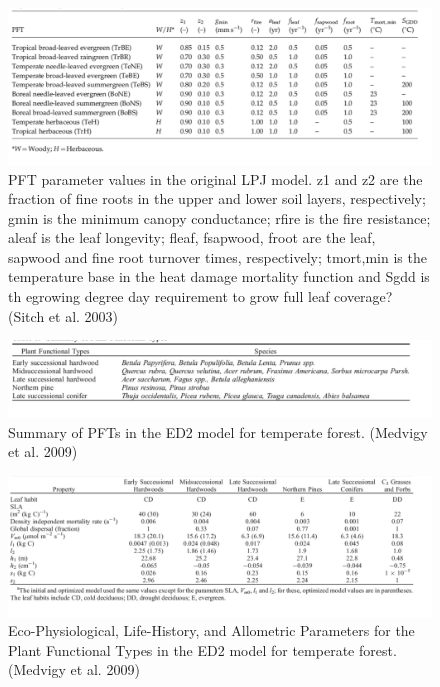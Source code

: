 \documentclass[12pt,oneside]{book}
\begin{document}
\begin{figure}

{\centering \includegraphics[width=0.8\linewidth]{figures/chap7/f714_LPJ_pft_table} 

}

\caption{PFT parameter values in the original LPJ model. z1 and z2 are the fraction of fine roots in the upper and lower soil layers, respectively; gmin is the minimum canopy conductance; rfire is the fire resistance; aleaf is the leaf longevity; fleaf, fsapwood, froot are the leaf, sapwood and fine root turnover times, respectively; tmort,min is the temperature base in the heat damage mortality function and Sgdd is th egrowing degree day requirement to grow full leaf coverage? (Sitch et al. 2003)}\label{fig:f714}
\end{figure}

\begin{figure}

{\centering \includegraphics[width=0.8\linewidth]{figures/chap7/f715_ed2_pft_table} 

}

\caption{Summary of PFTs in the ED2 model for temperate forest. (Medvigy  et al. 2009)}\label{fig:f715}
\end{figure}

\begin{figure}

{\centering \includegraphics[width=0.8\linewidth]{figures/chap7/f716_ED2_pft_values_table} 

}

\caption{Eco-Physiological, Life-History, and Allometric Parameters for the Plant Functional Types in the ED2 model for temperate forest. (Medvigy et al. 2009)}\label{fig:f716}
\end{figure}
\end{document}
